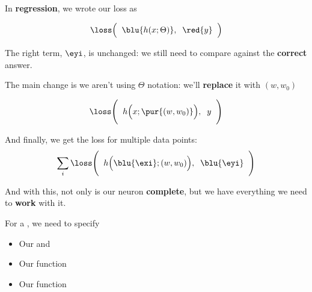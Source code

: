         In \textbf{regression}, we wrote our loss as
        
        \begin{equation*}
            \loss 
            \Big( \;\;
                \blu{h(x; \Theta)}, \;\;
                \red{y} 
            \;\;\Big) 
        \end{equation*}
        
        The right term, $\eyi$, is unchanged: we still need to compare against the \textbf{correct} answer.
        
        The main change is we aren't using $\Theta$ notation: we'll \textbf{replace} it with $(w,w_0)$
        
        \begin{equation*}
            \loss 
            \Bigg( \;\;
                h
                \Big(
                    x; \pur{(w, w_0)}
                \Big), \;\;
                y 
            \;\;\Bigg) 
        \end{equation*}
        
        And finally, we get the loss for multiple data points: 
        \begin{equation*}
            \sum_i
            \loss 
            \Bigg( \;\;
                h
                \Big(
                    \blu{\exi}; (w, w_0)
                \Big), \;\;
                \blu{\eyi} 
            \;\;\Bigg) 
        \end{equation*}
        
        And with this, not only is our neuron \textbf{complete}, but we have everything we need to \textbf{work} with it.\\
        
        \begin{concept}
            For a , we need to specify
        
            \begin{itemize}
                \item Our  and 
                \item Our  function
                \item Our  function
            \end{itemize}
        \end{concept}
        
